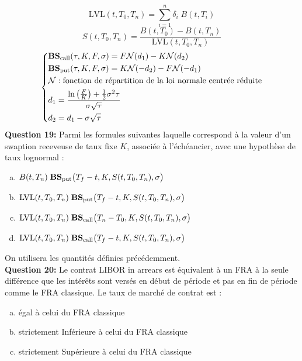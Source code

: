\documentclass{article}
\newcommand{\indentitem}{\setlength\itemindent{25pt}}
\begin{document}
\[
\text{LVL}(t,T_0,T_n)=\sum_{i=1}^{n}\delta_i \;B(t,T_i)
\]
\[
S(t,T_0,T_n)= \frac{B(t,T_0)-B(t,T_n)}{\text{LVL}(t,T_0,T_n)}
\]
\[
\left\{
\begin{split}
&\text{\textbf{BS}}_\text{call}(\tau,K,F,\sigma)=F\mathcal{N}(d_1)-K \mathcal{N}(d_2)\\
&\text{\textbf{BS}}_\text{put}(\tau,K,F,\sigma)=K\mathcal{N}(-d_2)-F \mathcal{N}(-d_1)\\
&\mathcal{N} : \text{fonction de répartition de la loi normale centrée réduite}\\
&d_1=\frac{\ln\left(\frac{F}{K}\right)+\frac{1}{2}\sigma^2\tau}{\sigma\sqrt{\tau}}\\
&d_2=d_1-\sigma\sqrt{\tau}
\end{split}
\right.
\]
\textbf{Question 19:}
Parmi les formules suivantes laquelle correspond à la valeur d’un swaption receveuse de taux fixe $K$, associée à l’échéancier,  avec une hypothèse de taux lognormal :
\begin{enumerate}[a)]
\indentitem \item $B(t,T_n) \;\text{\textbf{BS}}_\text{put}\big(T_f-t,K,S(t,T_{0},T_n),\sigma\big)$
\indentitem \item $\text{LVL}(t,T_0,T_n) \;\text{\textbf{BS}}_\text{put}\big(T_f-t,K,S(t,T_{0},T_n),\sigma\big)$
\indentitem \item $\text{LVL}(t,T_0,T_n) \;\text{\textbf{BS}}_\text{call}\big(T_n-T_0,K,S(t,T_{0},T_n),\sigma\big)$
\indentitem \item $\text{LVL}(t,T_0,T_n) \;\text{\textbf{BS}}_\text{call}\big(T_f-t,K,S(t,T_{0},T_n),\sigma\big)$

\end{enumerate}
On utilisera les quantités définies précédemment.\\
\textbf{Question 20:} 
Le contrat LIBOR in arrears est équivalent à un FRA à la seule différence que les intérêts sont versés en début de période et pas en fin de période comme le FRA classique. Le taux de marché de contrat est :
\begin{enumerate}[a)]
\indentitem \item égal à celui du FRA classique
\indentitem \item strictement Inférieure à celui du FRA classique
\indentitem \item strictement Supérieure à celui du FRA classique
\end{enumerate}
\end{document}
